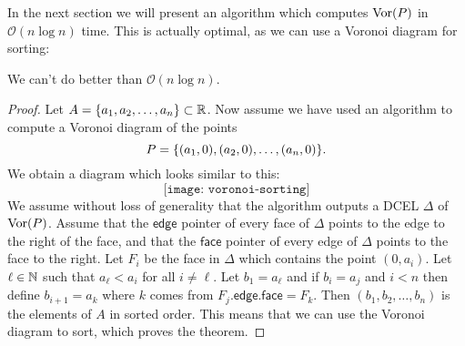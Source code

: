 In the next section we will present an algorithm which computes $\operatorname{Vor}(P)$ in $\mathcal{O}(n \log n)$ time. This is actually optimal, as we can use a Voronoi diagram for sorting:
\begin{thm} \label{thm:voronoicansort}
We can't do better than $\mathcal{O}(n \log n)$.
\end{thm}
\begin{proof}
Let $A = \{a_1, a_2, \ldots, a_n\} \subset \mathbb{R}$. Now assume we have used an algorithm to compute a Voronoi diagram of the points
\[
    P = \{(a_1, 0), (a_2, 0), \ldots, (a_n, 0)\}.
\]
We obtain a diagram which looks similar to this:
\[
    \texttt{[image: voronoi-sorting]}
\]
We assume without loss of generality that the algorithm outputs a DCEL $\Delta$ of $\operatorname{Vor}(P)$. Assume that the $\textsf{edge}$ pointer of every face of $\Delta$ points to the edge to the right of the face, and that the $\textsf{face}$ pointer of every edge of $\Delta$ points to the face to the right. Let $F_i$ be the face in $\Delta$ which contains the point $(0, a_i)$. Let $\ell \in \mathbb{N}$ such that $a_{\ell} < a_i$ for all $i \ne \ell$. Let $b_1 = a_{\ell}$ and if $b_i = a_{j}$ and $i < n$ then define $b_{i+1} = a_k$ where $k$ comes from $F_{j}\textsf{.edge.face} = F_k$. Then $(b_1, b_2, \ldots, b_n)$ is the elements of $A$ in sorted order. This means that we can use the Voronoi diagram to sort, which proves the theorem.
\end{proof}

